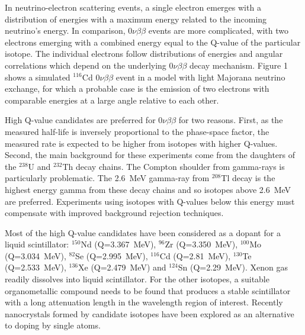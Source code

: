 \documentclass[cits]{JINST}
\begin{document}
In neutrino-electron scattering events, a single electron emerges with a distribution of energies with a maximum energy related to the incoming neutrino's energy. In comparison, $0\nu\beta\beta$ events are more complicated, with two electrons emerging with a combined energy equal
to the Q-value of the particular isotope. The individual
electrons follow distributions of energies and angular correlations which depend on the underlying $0\nu\beta\beta$ decay mechanism\cite{SuperNEMO,newphysics0nuBB,bandv}. Figure 1 shows a simulated $^{116}$Cd $0\nu\beta\beta$ event in a model with light Majorana neutrino exchange, for which a probable case is the emission of two electrons with comparable energies at a large angle relative to each other. 

High Q-value candidates are preferred for $0\nu\beta\beta$  for two reasons. First, as the measured half-life is inversely proportional to the phase-space factor, the measured rate is expected to be higher from isotopes with higher Q-values. Second, the main background for these experiments come from the daughters of the $^{238}$U and $^{232}$Th decay chains. The Compton shoulder from gamma-rays is particularly problematic. The 2.6~MeV gamma-ray from $^{208}$Tl decay is the highest energy gamma from these decay chains and so isotopes above 2.6~MeV are preferred.  Experiments using isotopes with Q-values below this energy must compensate with improved background rejection techniques.

Most of the high Q-value candidates\cite{tabledbb}
have been considered as a dopant for a liquid scintillator:
$^{150}$Nd (Q=3.367~MeV)\cite{minfang,nd1}, $^{96}$Zr (Q=3.350~MeV)\cite{zr1},
$^{100}$Mo (Q=3.034~MeV)\cite{mo1}, $^{82}$Se (Q=2.995~MeV)\cite{qdot},
$^{116}$Cd (Q=2.81~MeV)\cite{qdot, cd1}, $^{130}$Te (Q=2.533~MeV)\cite{qdot, biller},
$^{136}$Xe (Q=2.479~MeV)\cite{KZ0nu} and $^{124}$Sn (Q=2.29~MeV)\cite{sn1}.
Xenon gas readily dissolves into liquid scintillator. For the other isotopes,
a suitable organometallic compound needs to be found that produces a stable
scintillator with a long attenuation length in the wavelength region of
interest. Recently nanocrystals formed by candidate isotopes have been explored as an alternative to doping by single atoms\cite{qdot,qdot2}.
\end{document}
